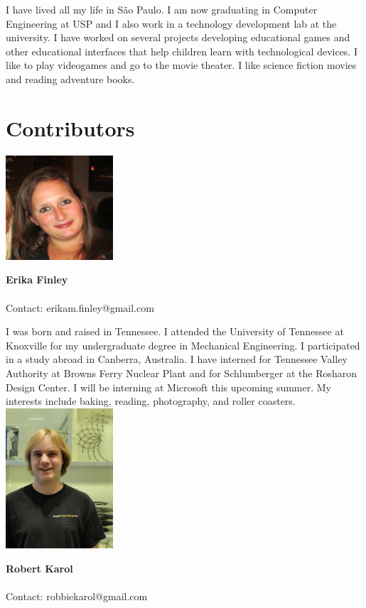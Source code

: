 I have lived all my life in S\~{a}o Paulo. I am now graduating in Computer Engineering at USP and I also work in a technology development lab at the university. I have worked on several projects developing educational games and other educational interfaces that help children learn with technological devices.  I like to play videogames and go to the movie theater. I like science fiction movies and reading adventure books.
\\ 


\section{Contributors}

\noindent \includegraphics[width=40mm]{images/image012.jpg}
\parbox[b]{0.6\textwidth}{\textbf{Erika Finley}\\ \\
Contact: erikam.finley@gmail.com  \\
}

I was born and raised in Tennessee. I attended the University of Tennessee at Knoxville for my undergraduate degree in Mechanical Engineering. I participated in a study abroad in Canberra, Australia. I have interned for Tennessee Valley Authority at Browns Ferry Nuclear Plant and for Schlumberger at the Rosharon Design Center. I will be interning at Microsoft this upcoming summer. My interests include baking, reading, photography, and roller coasters.
\\

\noindent \includegraphics[width=40mm]{images/robert_karol.jpg}
\parbox[b]{0.6\textwidth}{\textbf{Robert Karol}\\ \\
Contact: robbiekarol@gmail.com  \\
}

